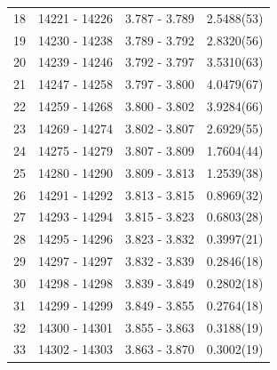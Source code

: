 \begin{table}[H]
\begin{tabular}{r l c l}
18 & 14221 - 14226 & 3.787 - 3.789 & 2.5488(53) \\
19 & 14230 - 14238 & 3.789 - 3.792 & 2.8320(56) \\
20 & 14239 - 14246 & 3.792 - 3.797 & 3.5310(63) \\
21 & 14247 - 14258 & 3.797 - 3.800 & 4.0479(67) \\
22 & 14259 - 14268 & 3.800 - 3.802 & 3.9284(66) \\
23 & 14269 - 14274 & 3.802 - 3.807 & 2.6929(55) \\
24 & 14275 - 14279 & 3.807 - 3.809 & 1.7604(44) \\
25 & 14280 - 14290 & 3.809 - 3.813 & 1.2539(38) \\
26 & 14291 - 14292 & 3.813 - 3.815 & 0.8969(32) \\
27 & 14293 - 14294 & 3.815 - 3.823 & 0.6803(28) \\
28 & 14295 - 14296 & 3.823 - 3.832 & 0.3997(21) \\
29 & 14297 - 14297 & 3.832 - 3.839 & 0.2846(18) \\
30 & 14298 - 14298 & 3.839 - 3.849 & 0.2802(18) \\
31 & 14299 - 14299 & 3.849 - 3.855 & 0.2764(18) \\
32 & 14300 - 14301 & 3.855 - 3.863 & 0.3188(19) \\
33 & 14302 - 14303 & 3.863 - 3.870 & 0.3002(19) \\

\end{tabular}
\end{table}
